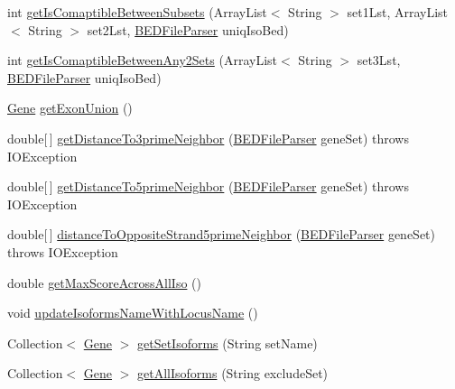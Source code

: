 \begin{DoxyCompactItemize}
\item 
int \hyperlink{classbroad_1_1pda_1_1annotation_1_1_locus_aca7ea4321216f5ca4124c8e5a879cb2d}{get\+Is\+Comaptible\+Between\+Subsets} (Array\+List$<$ String $>$ set1\+Lst, Array\+List$<$ String $>$ set2\+Lst, \hyperlink{classbroad_1_1pda_1_1annotation_1_1_b_e_d_file_parser}{B\+E\+D\+File\+Parser} uniq\+Iso\+Bed)
\item 
int \hyperlink{classbroad_1_1pda_1_1annotation_1_1_locus_a75dbd05a84b105dc531219db343f260d}{get\+Is\+Comaptible\+Between\+Any2\+Sets} (Array\+List$<$ String $>$ set3\+Lst, \hyperlink{classbroad_1_1pda_1_1annotation_1_1_b_e_d_file_parser}{B\+E\+D\+File\+Parser} uniq\+Iso\+Bed)
\item 
\hyperlink{classumms_1_1core_1_1annotation_1_1_gene}{Gene} \hyperlink{classbroad_1_1pda_1_1annotation_1_1_locus_a0cfa9aabc38cfea8f8f657cc656bba87}{get\+Exon\+Union} ()
\item 
double\mbox{[}$\,$\mbox{]} \hyperlink{classbroad_1_1pda_1_1annotation_1_1_locus_ac1ada0b4c99e92fd6acad2f68b9e4f2d}{get\+Distance\+To3prime\+Neighbor} (\hyperlink{classbroad_1_1pda_1_1annotation_1_1_b_e_d_file_parser}{B\+E\+D\+File\+Parser} gene\+Set)  throws I\+O\+Exception
\item 
double\mbox{[}$\,$\mbox{]} \hyperlink{classbroad_1_1pda_1_1annotation_1_1_locus_aebe1e52c92b834e03198cd903f164244}{get\+Distance\+To5prime\+Neighbor} (\hyperlink{classbroad_1_1pda_1_1annotation_1_1_b_e_d_file_parser}{B\+E\+D\+File\+Parser} gene\+Set)  throws I\+O\+Exception
\item 
double\mbox{[}$\,$\mbox{]} \hyperlink{classbroad_1_1pda_1_1annotation_1_1_locus_a4d28eb0727bd949d765d4bf79dbc265e}{distance\+To\+Opposite\+Strand5prime\+Neighbor} (\hyperlink{classbroad_1_1pda_1_1annotation_1_1_b_e_d_file_parser}{B\+E\+D\+File\+Parser} gene\+Set)  throws I\+O\+Exception
\item 
double \hyperlink{classbroad_1_1pda_1_1annotation_1_1_locus_ab5b65d99190dfd997054dd358c800c5b}{get\+Max\+Score\+Across\+All\+Iso} ()
\item 
void \hyperlink{classbroad_1_1pda_1_1annotation_1_1_locus_a2408fa698802fecf31b20dbe53a23596}{update\+Isoforms\+Name\+With\+Locus\+Name} ()
\item 
Collection$<$ \hyperlink{classumms_1_1core_1_1annotation_1_1_gene}{Gene} $>$ \hyperlink{classbroad_1_1pda_1_1annotation_1_1_locus_a93df766c9727f3ed89e79c321cef078a}{get\+Set\+Isoforms} (String set\+Name)
\item 
Collection$<$ \hyperlink{classumms_1_1core_1_1annotation_1_1_gene}{Gene} $>$ \hyperlink{classbroad_1_1pda_1_1annotation_1_1_locus_a19c4c5f51f36903524cc17e2a0f88158}{get\+All\+Isoforms} (String exclude\+Set)

\end{DoxyCompactItemize}
